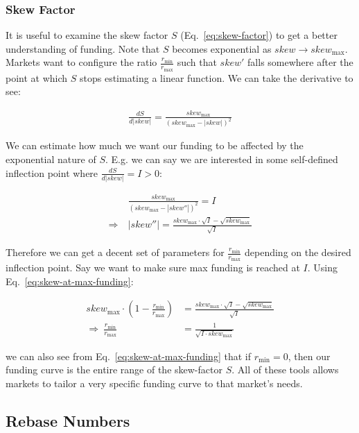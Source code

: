 \documentclass[letterpaper]{article}
\begin{document}
\begin{multicols}{2}
\subsubsection*{Skew Factor}
It is useful to examine the skew factor $S$ (Eq.~\ref{eq:skew-factor}) to get a better understanding of funding. Note that $S$ becomes exponential as $skew \rightarrow skew_{\text{max}}$. Markets want to configure the ratio $\frac{r_{\text{min}}}{r_{\text{max}}}$ such that $skew'$ falls somewhere after the point at which $S$ stops estimating a linear function. We can take the derivative to see:

\begin{align}
    \frac{dS}{d|skew|} = \frac{skew_{\text{max}}}{(skew_{\text{max}} - |skew|)^2}
\end{align}

We can estimate how much we want our funding to be affected by the exponential nature of $S$. E.g. we can say we are interested in some self-defined inflection point where $\frac{dS}{d|skew|} = I > 0$: 

\begin{align}
    &\frac{skew_{\text{max}}}{(skew_{\text{max}} - |skew''|)^2} = I \\
    \Rightarrow~&|skew''| = \frac{skew_{\text{max}} \cdot \sqrt{I} - \sqrt{skew_{\text{max}}}}{\sqrt{I}}
\end{align}

Therefore we can get a decent set of parameters for $\frac{r_{\text{min}}}{r_{\text{max}}}$ depending on the desired inflection point. Say we want to make sure max funding is reached at $I$. Using Eq.~\ref{eq:skew-at-max-funding}:

\begin{align}
    skew_{\text{max}} \cdot (1 - \frac{r_{\text{min}}}{r_{\text{max}}}) &= \frac{skew_{\text{max}} \cdot \sqrt{I} - \sqrt{skew_{\text{max}}}}{\sqrt{I}} \nonumber \\
    \Rightarrow~\frac{r_{\text{min}}}{r_{\text{max}}}&=\frac{1}{\sqrt{I \cdot skew_{\text{max}}}}
\end{align}

we can also see from Eq.~\ref{eq:skew-at-max-funding} that if $r_{\text{min}}=0$, then our funding curve is the entire range of the skew-factor $S$. All of these tools allows markets to tailor a very specific funding curve to that market's needs. 

\subsection*{Rebase Numbers}
\label{app:rebase-appendix}


\end{multicols}
\end{document}
